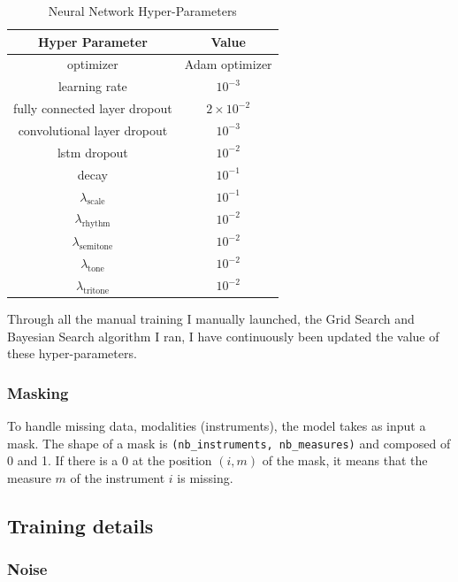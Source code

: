 \documentclass[12pt]{report}
\begin{document}
\begin{table}[]
    \centering
    \begin{tabular}{c|c}
        Hyper Parameter & Value \\
        \hline
        optimizer &  Adam optimizer \cite{brownlee_gentle_2017, bushaev_adam_2018, kingma_adam_2017} \\
        learning rate & $10^{-3}$ \\
        fully connected layer dropout & $2 \times 10^{-2}$ \\
        convolutional layer dropout & $10^{-3}$ \\
        lstm dropout & $10^{-2}$ \\
        decay & $10^{-1}$ \\
        $\lambda_{\text{scale}}$ & $10^{-1}$ \\
        $\lambda_{\text{rhythm}}$ & $10^{-2}$ \\
        $\lambda_{\text{semitone}}$ & $10^{-2}$ \\
        $\lambda_{\text{tone}}$ & $10^{-2}$ \\
        $\lambda_{\text{tritone}}$ & $10^{-2}$ \\
    \end{tabular}
    \caption{Neural Network Hyper-Parameters}
    \label{tab:network-hp}
\end{table}

Through all the manual training I manually launched, the Grid Search and Bayesian Search algorithm I ran, I have continuously been updated the value of these hyper-parameters.

\subsubsection{Masking}

To handle missing data, modalities (instruments), the model takes as input a mask.
The shape of a mask is \texttt{(nb\_instruments, nb\_measures)} and composed of 0 and 1.
If there is a 0 at the position $(i, m)$ of the mask, it means that the measure $m$ of the instrument $i$ is missing.


\subsection{Training details}

\subsubsection{Noise}
\end{document}
